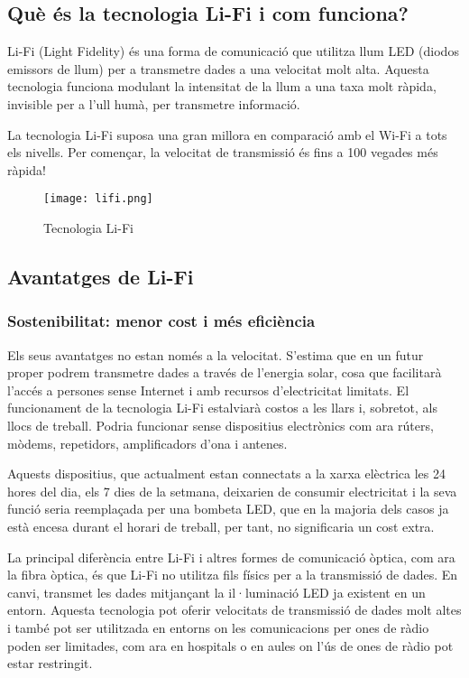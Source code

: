 
\subsection*{Què és la tecnologia Li-Fi i com funciona?}

Li-Fi (Light Fidelity) és una forma de comunicació que utilitza llum LED (diodos emissors de llum) per a transmetre dades a una velocitat molt alta. Aquesta tecnologia funciona modulant la intensitat de la llum a una taxa molt ràpida, invisible per a l'ull humà, per transmetre informació.

La tecnologia Li-Fi suposa una gran millora en comparació amb el Wi-Fi a tots els nivells. Per començar, la velocitat de transmissió és fins a 100 vegades més ràpida!

\begin{figure}[h!]
    \centering
    \texttt{[image: lifi.png]}
    \caption{Tecnologia Li-Fi}
\end{figure}


\subsection*{Avantatges de Li-Fi}

\subsubsection*{Sostenibilitat: menor cost i més eficiència}

Els seus avantatges no estan només a la velocitat. S'estima que en un futur proper podrem transmetre dades a través de l'energia solar, cosa que facilitarà l'accés a persones sense Internet i amb recursos d'electricitat limitats. El funcionament de la tecnologia Li-Fi estalviarà costos a les llars i, sobretot, als llocs de treball. Podria funcionar sense dispositius electrònics com ara rúters, mòdems, repetidors, amplificadors d'ona i antenes.

Aquests dispositius, que actualment estan connectats a la xarxa elèctrica les 24 hores del dia, els 7 dies de la setmana, deixarien de consumir electricitat i la seva funció seria reemplaçada per una bombeta LED, que en la majoria dels casos ja està encesa durant el horari de treball, per tant, no significaria un cost extra.

La principal diferència entre Li-Fi i altres formes de comunicació òptica, com ara la fibra òptica, és que Li-Fi no utilitza fils físics per a la transmissió de dades. En canvi, transmet les dades mitjançant la il·luminació LED ja existent en un entorn. Aquesta tecnologia pot oferir velocitats de transmissió de dades molt altes i també pot ser utilitzada en entorns on les comunicacions per ones de ràdio poden ser limitades, com ara en hospitals o en aules on l'ús de ones de ràdio pot estar restringit.

